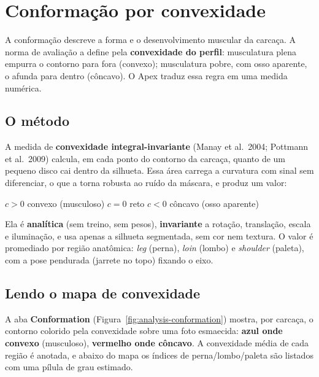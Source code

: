 \chapter{Conformação por convexidade}


\vspace{4pt}
A conformação descreve a forma e o desenvolvimento muscular da carcaça. A
norma de avaliação a define pela \textbf{convexidade do perfil}: musculatura plena
empurra o contorno para fora (convexo); musculatura pobre, com osso aparente, o afunda
para dentro (côncavo). O Apex traduz essa regra em uma medida numérica.

\section{O método}

A medida de \textbf{convexidade integral-invariante} (Manay et al.\ 2004; Pottmann
et al.\ 2009) calcula, em cada ponto do contorno da carcaça, quanto de um pequeno
disco cai dentro da silhueta. Essa área carrega a curvatura com sinal sem
diferenciar, o que a torna robusta ao ruído da máscara, e produz um valor:

\begin{center}
\ttfamily $c > 0$ \rm convexo (musculoso) \quad\textbullet\quad
\ttfamily $c = 0$ \rm reto \quad\textbullet\quad
\ttfamily $c < 0$ \rm côncavo (osso aparente)
\end{center}

Ela é \textbf{analítica} (sem treino, sem pesos), \textbf{invariante} a
rotação, translação, escala e iluminação, e usa apenas a silhueta segmentada,
sem cor nem textura. O valor é promediado por região anatômica: \emph{leg}
(perna), \emph{loin} (lombo) e \emph{shoulder} (paleta), com a pose pendurada
(jarrete no topo) fixando o eixo.

\section{Lendo o mapa de convexidade}

A aba \textbf{Conformation} (Figura~\ref{fig:analysis-conformation}) mostra, por
carcaça, o contorno colorido pela convexidade sobre uma foto esmaecida: \textbf{azul onde
convexo} (musculoso), \textbf{vermelho onde côncavo}. A convexidade média de cada região é
anotada, e abaixo do mapa os índices de perna/lombo/paleta são listados com uma
pílula de grau estimado.

